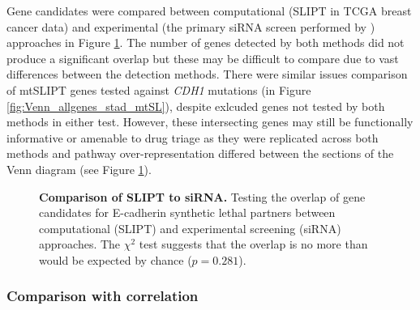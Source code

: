 Gene candidates were compared between computational (SLIPT in TCGA breast cancer data) and experimental (the primary siRNA screen performed by \citet{Telford2015}) approaches in Figure \ref{fig:Venn_allgenes}. The number of genes detected by both methods did not produce a significant overlap but these may be difficult to compare due to vast differences between the detection methods. There were similar issues comparison of mtSLIPT genes tested against \textit{CDH1} mutations (in Figure \ref{fig:Venn_allgenes_stad_mtSL}), despite exlcuded genes not tested by both methods in either test. However, these intersecting genes may still be functionally informative or amenable to drug triage as they were replicated across both methods and pathway over-represent\-ation differed between the sections of the Venn diagram (see Figure \ref{fig:Venn_allgenes}).

\begin{figure}[!ht]
\begin{mdframed}
  \centering
    \caption[Comparison of SLIPT to siRNA]{\small \textbf{Comparison of SLIPT to siRNA.} Testing the overlap of gene candidates for E-cadherin synthetic lethal partners between computational (SLIPT) and experimental screening (siRNA) approaches. The $\chi^2$ test suggests that the overlap is no more than would be expected by chance ($p = 0.281$). %
}
\label{fig:Venn_allgenes}
\end{mdframed}
\end{figure}


\FloatBarrier

\subsubsection{Comparison with correlation} \label{chapt3:compare_correlation} 

